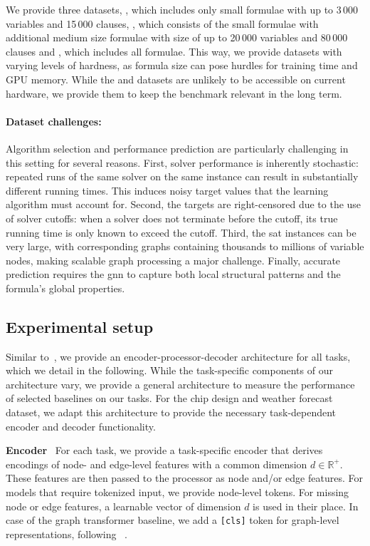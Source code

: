 We provide three datasets, , which includes only small formulae with up to 3\,000 variables and 15\,000 clauses, , which consists of the small formulae with additional medium size formulae with size of up to 20\,000 variables and 80\,000 clauses and , which includes all formulae. This way, we provide datasets with varying levels of hardness, as formula size can pose hurdles for training time and GPU memory. While the  and  datasets are unlikely to be accessible on current hardware, we provide them to keep the benchmark relevant in the long term.


\paragraph{Dataset challenges:} Algorithm selection and performance prediction are particularly challenging in this setting for several reasons. First, solver performance is inherently stochastic: repeated runs of the same solver on the same instance can result in substantially different running times. This induces noisy target values that the learning algorithm must account for. Second, the targets are right-censored due to the use of solver cutoffs: when a solver does not terminate before the cutoff, its true running time is only known to exceed the cutoff. Third, the \gls{sat} instances can be very large, with corresponding graphs containing thousands to millions of variable nodes, making scalable graph processing a major challenge. Finally, accurate prediction requires the \gls{gnn} to capture both local structural patterns and the formula's global properties.

\subsection{Experimental setup}\label{sec:ch06:ExpSetup}
Similar to~\cite{BecEtAl25,StoEtAl25}, we provide an encoder-processor-decoder architecture for all tasks, which we detail in the following. While the task-specific components of our architecture vary, we provide a general architecture to measure the performance of selected baselines on our tasks. For the chip design and weather forecast dataset, we adapt this architecture to provide the necessary task-dependent encoder and decoder functionality. 

\textbf{Encoder}~
For each task, we provide a task-specific encoder that derives encodings of node- and edge-level features with a common dimension $d \in \mathbb{R}^+$. These features are then passed to the processor as node and/or edge features. For models that require tokenized input, we provide node-level tokens. For missing node or edge features, a learnable vector of dimension $d$ is used in their place. In case of the graph transformer baseline, we add a \texttt{[cls]} token for graph-level representations, following ~\cite{BecEtAl25,StoEtAl25}. 

